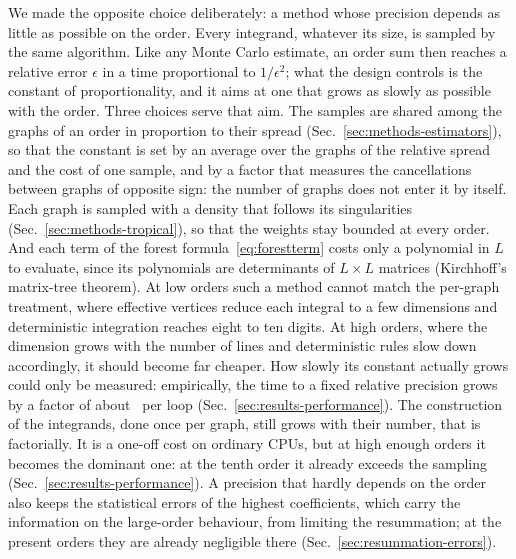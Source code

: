 We made the opposite choice deliberately: a method whose precision depends as little as possible on the order. Every
integrand, whatever its size, is sampled by the same algorithm. Like any Monte Carlo estimate, an order sum then
reaches a relative error $\epsilon$ in a time proportional to $1/\epsilon^2$; what the design controls is the constant of
proportionality, and it aims at one that grows as slowly as possible with the order. Three choices serve that aim. The
samples are shared among the graphs of an order in proportion to their spread (Sec.~\ref{sec:methods-estimators}),
so that the constant is set by an average over the graphs of the relative spread and the cost of one sample, and by a
factor that measures the cancellations between graphs of opposite sign: the number of graphs does not enter it by itself. Each
graph is sampled with a density that follows its singularities (Sec.~\ref{sec:methods-tropical}), so that the weights
stay bounded at every order. And each term of the forest formula~\eqref{eq:forestterm} costs only a polynomial in $L$
to evaluate, since its polynomials are determinants of $L\times L$ matrices (Kirchhoff's matrix-tree theorem). At low
orders such a method cannot match the per-graph treatment, where effective vertices reduce each integral to a few
dimensions and deterministic integration reaches eight to ten digits. At high orders, where the dimension grows with
the number of lines and deterministic rules slow down accordingly, it should become far cheaper. How slowly its
constant actually grows could only be measured: empirically, the time to a fixed relative precision grows by a factor of about
\costgrowthrange\ per loop (Sec.~\ref{sec:results-performance}). The
construction of the integrands, done once per graph, still grows with their number, that is factorially. It is a
one-off cost on ordinary CPUs, but at high enough orders it becomes the dominant one: at the tenth order it already
exceeds the sampling (Sec.~\ref{sec:results-performance}). A precision that hardly depends on the order also keeps
the statistical errors of the highest coefficients, which carry the information on the large-order behaviour, from
limiting the resummation; at the present orders they are already negligible there (Sec.~\ref{sec:resummation-errors}).

